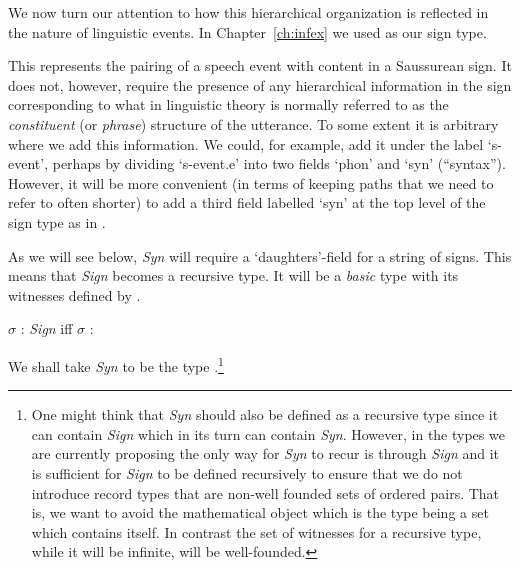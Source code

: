 We now turn our attention to how this hierarchical organization is
reflected in the nature of linguistic events.  In
Chapter~\ref{ch:infex} we used \nexteg{} as our sign type.
\begin{ex} 
\end{ex} 
This represents the pairing of a speech event with content in a
Saussurean sign.  It does not, however, require the presence of any
hierarchical information in the sign corresponding to what in
linguistic theory is normally referred to as the \textit{constituent} (or
\textit{phrase}) structure of the utterance.  To some extent it is
arbitrary where we add this information.  We could, for example, add
it under the label `s-event', perhaps by dividing `s-event.e' into two
fields `phon' and `syn' (``syntax'').  However, it will be more
convenient (in terms of keeping paths that we need to refer to often
shorter) to add a third field labelled `syn' at the top level of the
sign type as in \nexteg{}.
\begin{ex} 
\end{ex}
As we will see below, \textit{Syn} will require a
`daughters'-field for a string of signs.  This means that
\textit{Sign} becomes a recursive type.  It will be a \textit{basic}
type with its witnesses defined by \nexteg{}.
\begin{ex} 
$\sigma$ : \textit{Sign} iff $\sigma$ :   
\end{ex} 
We shall take \textit{Syn} to be the type \nexteg{}.\footnote{One
  might think that \textit{Syn} should also be defined as a recursive
  type since it can contain \textit{Sign} which in its turn can
  contain \textit{Syn}.  However, in the types we are currently
  proposing the only way for \textit{Syn} to recur is through
  \textit{Sign} and it is sufficient for \textit{Sign} to
  be defined recursively to ensure that we do not introduce record
  types that are non-well founded sets of ordered pairs.  That is, we
  want to avoid the mathematical object which is the type being a set
  which contains itself.  In contrast the set of witnesses for
  a recursive type, while it will be infinite, will be well-founded.}
\begin{ex} 
\end{ex}

